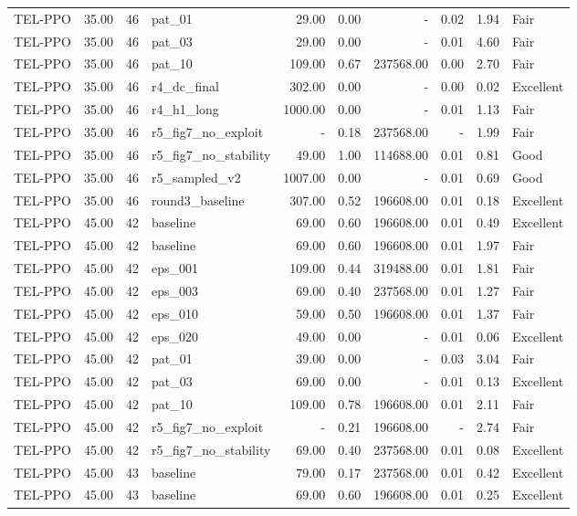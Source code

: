 \begin{table}[htbp]
\begin{tabular}{lrrlrrrrrl}
TEL-PPO & 35.00 & 46 & pat_01 & 29.00 & 0.00 & - & 0.02 & 1.94 & Fair \\
TEL-PPO & 35.00 & 46 & pat_03 & 29.00 & 0.00 & - & 0.01 & 4.60 & Fair \\
TEL-PPO & 35.00 & 46 & pat_10 & 109.00 & 0.67 & 237568.00 & 0.00 & 2.70 & Fair \\
TEL-PPO & 35.00 & 46 & r4_dc_final & 302.00 & 0.00 & - & 0.00 & 0.02 & Excellent \\
TEL-PPO & 35.00 & 46 & r4_h1_long & 1000.00 & 0.00 & - & 0.01 & 1.13 & Fair \\
TEL-PPO & 35.00 & 46 & r5_fig7_no_exploit & - & 0.18 & 237568.00 & - & 1.99 & Fair \\
TEL-PPO & 35.00 & 46 & r5_fig7_no_stability & 49.00 & 1.00 & 114688.00 & 0.01 & 0.81 & Good \\
TEL-PPO & 35.00 & 46 & r5_sampled_v2 & 1007.00 & 0.00 & - & 0.01 & 0.69 & Good \\
TEL-PPO & 35.00 & 46 & round3_baseline & 307.00 & 0.52 & 196608.00 & 0.01 & 0.18 & Excellent \\
TEL-PPO & 45.00 & 42 & baseline & 69.00 & 0.60 & 196608.00 & 0.01 & 0.49 & Excellent \\
TEL-PPO & 45.00 & 42 & baseline & 69.00 & 0.60 & 196608.00 & 0.01 & 1.97 & Fair \\
TEL-PPO & 45.00 & 42 & eps_001 & 109.00 & 0.44 & 319488.00 & 0.01 & 1.81 & Fair \\
TEL-PPO & 45.00 & 42 & eps_003 & 69.00 & 0.40 & 237568.00 & 0.01 & 1.27 & Fair \\
TEL-PPO & 45.00 & 42 & eps_010 & 59.00 & 0.50 & 196608.00 & 0.01 & 1.37 & Fair \\
TEL-PPO & 45.00 & 42 & eps_020 & 49.00 & 0.00 & - & 0.01 & 0.06 & Excellent \\
TEL-PPO & 45.00 & 42 & pat_01 & 39.00 & 0.00 & - & 0.03 & 3.04 & Fair \\
TEL-PPO & 45.00 & 42 & pat_03 & 69.00 & 0.00 & - & 0.01 & 0.13 & Excellent \\
TEL-PPO & 45.00 & 42 & pat_10 & 109.00 & 0.78 & 196608.00 & 0.01 & 2.11 & Fair \\
TEL-PPO & 45.00 & 42 & r5_fig7_no_exploit & - & 0.21 & 196608.00 & - & 2.74 & Fair \\
TEL-PPO & 45.00 & 42 & r5_fig7_no_stability & 69.00 & 0.40 & 237568.00 & 0.01 & 0.08 & Excellent \\
TEL-PPO & 45.00 & 43 & baseline & 79.00 & 0.17 & 237568.00 & 0.01 & 0.42 & Excellent \\
TEL-PPO & 45.00 & 43 & baseline & 69.00 & 0.60 & 196608.00 & 0.01 & 0.25 & Excellent \\

\end{tabular}
\end{table}
